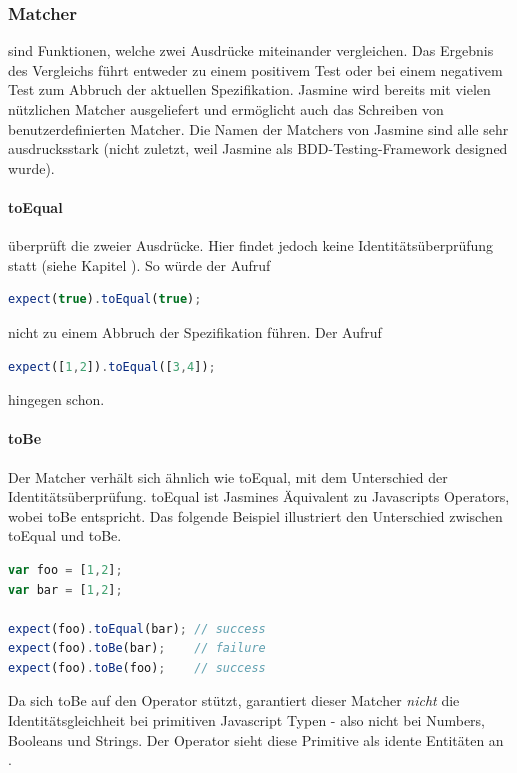 {\subsubsection{Matcher}
 sind Funktionen, welche zwei Ausdrücke miteinander vergleichen. Das Ergebnis des Vergleichs führt entweder zu einem positivem Test oder bei einem negativem Test zum Abbruch der aktuellen Spezifikation. Jasmine wird bereits mit vielen nützlichen Matcher ausgeliefert und ermöglicht auch das Schreiben von benutzerdefinierten Matcher. Die Namen der Matchers von Jasmine sind alle sehr ausdrucksstark (nicht zuletzt, weil Jasmine als BDD-Testing-Framework designed wurde).

\paragraph{toEqual}
 überprüft die  zweier Ausdrücke. Hier findet jedoch keine Identitätsüberprüfung statt (siehe Kapitel ). So würde der Aufruf
\begin{lstlisting}[language=JavaScript]
  expect(true).toEqual(true);
\end{lstlisting}
nicht zu einem Abbruch der Spezifikation führen. Der Aufruf
\begin{lstlisting}[language=JavaScript]
  expect([1,2]).toEqual([3,4]);
\end{lstlisting}
hingegen schon.

\paragraph{toBe}
Der Matcher  verhält sich ähnlich wie toEqual, mit dem Unterschied der Identitätsüberprüfung. toEqual ist Jasmines Äquivalent zu Javascripts \glqq{==\grqq} Operators, wobei toBe \glqq{===\grqq} entspricht. Das folgende Beispiel illustriert den Unterschied zwischen toEqual und toBe.

\begin{lstlisting}[language=JavaScript]
var foo = [1,2];
var bar = [1,2];

expect(foo).toEqual(bar); // success
expect(foo).toBe(bar);    // failure
expect(foo).toBe(foo);    // success
\end{lstlisting}

Da sich toBe auf den \glqq{===\grqq} Operator stützt, garantiert dieser Matcher \textit{nicht} die Identitätsgleichheit bei primitiven Javascript Typen - also nicht bei Numbers, Booleans und Strings. Der \glqq{===\grqq} Operator sieht diese Primitive als idente Entitäten an \autocite[16]{Hahn:2013}.

}
